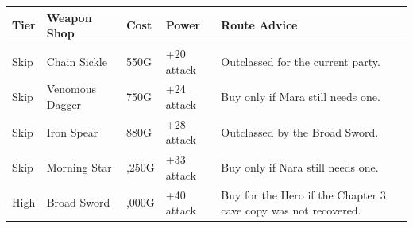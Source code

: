 \documentclass[
  american,
  10pt,
  letterpaper,
  oneside,
  open=any]{scrreprt}
\newcounter{none} %
\newenvironment{guidetable}{%
  \small\setstretch{1.0}%
  \setlength{\tabcolsep}{4pt}%
  \setlength{\LTpre}{8pt}\setlength{\LTpost}{10pt}%
  \renewcommand{\arraystretch}{1.16}%
}{ }
\begin{document}
\begin{guidetable}

{\def\LTcaptype{none} %
\begin{longtable}[]{@{}
  >{\raggedright\arraybackslash}p{}
  >{\raggedright\arraybackslash}p{}
  >{\raggedleft\arraybackslash}p{}
  >{\raggedleft\arraybackslash}p{}
  >{\raggedright\arraybackslash}p{}@{}}
\toprule\noalign{}
\begin{minipage}[b]{\linewidth}\raggedright
\color{GuideGreen}\bfseries Tier
\end{minipage} & \begin{minipage}[b]{\linewidth}\raggedright
\color{GuideGreen}\bfseries Weapon Shop
\end{minipage} & \begin{minipage}[b]{\linewidth}\raggedleft
\color{GuideGreen}\bfseries Cost
\end{minipage} & \begin{minipage}[b]{\linewidth}\raggedleft
\color{GuideGreen}\bfseries Power
\end{minipage} & \begin{minipage}[b]{\linewidth}\raggedright
\color{GuideGreen}\bfseries Route Advice
\end{minipage} \\
\midrule\noalign{}
\endhead
\bottomrule\noalign{}
\endlastfoot
Skip & Chain Sickle & 550G & +20 attack & Outclassed for the current
party. \\
Skip & Venomous Dagger & 750G & +24 attack & Buy only if Mara still
needs one. \\
Skip & Iron Spear & 880G & +28 attack & Outclassed by the Broad
Sword. \\
Skip & Morning Star & 1,250G & +33 attack & Buy only if Nara still needs
one. \\
High & Broad Sword & 2,000G & +40 attack & Buy for the Hero if the
Chapter 3 cave copy was not recovered. \\
\end{longtable}
}

\end{guidetable}
\end{document}
